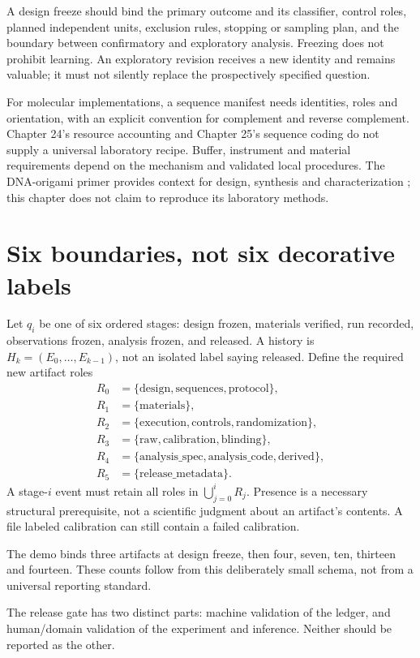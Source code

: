 A design freeze should bind the primary outcome and its classifier, control roles,
planned independent units, exclusion rules, stopping or sampling plan, and the
boundary between confirmatory and exploratory analysis. Freezing does not prohibit
learning. An exploratory revision receives a new identity and remains valuable;
it must not silently replace the prospectively specified question.

For molecular implementations, a sequence manifest needs identities, roles and
orientation, with an explicit convention for complement and reverse complement.
Chapter 24's resource accounting and Chapter 25's sequence coding do not supply
a universal laboratory recipe. Buffer, instrument and material requirements depend
on the mechanism and validated local procedures. The DNA-origami primer provides
context for design, synthesis and characterization \cite{Dey2021}; this chapter
does not claim to reproduce its laboratory methods.

\section{Six boundaries, not six decorative labels}
Let $q_i$ be one of six ordered stages:
design frozen, materials verified, run recorded, observations frozen, analysis
frozen, and released. A history is $H_k=(E_0,\ldots,E_{k-1})$, not an isolated label
saying released. Define the required new artifact roles
\[
\begin{aligned}
R_0&=\{\mathrm{design,sequences,protocol}\},\\
R_1&=\{\mathrm{materials}\},\\
R_2&=\{\mathrm{execution,controls,randomization}\},\\
R_3&=\{\mathrm{raw,calibration,blinding}\},\\
R_4&=\{\mathrm{analysis\_spec,analysis\_code,derived}\},\\
R_5&=\{\mathrm{release\_metadata}\}.
\end{aligned}
\]
A stage-$i$ event must retain all roles in $\bigcup_{j=0}^{i}R_j$. Presence is a
necessary structural prerequisite, not a scientific judgment about an artifact's
contents. A file labeled calibration can still contain a failed calibration.

The demo binds three artifacts at design freeze, then four, seven, ten,
thirteen and fourteen. These counts follow from this deliberately small
schema, not from a universal reporting standard.
\begin{center}\end{center}
The release gate has two distinct parts: machine validation of the ledger, and
human/domain validation of the experiment and inference. Neither should be
reported as the other.

